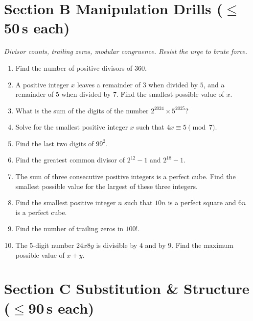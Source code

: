 \documentclass[11pt,a4paper]{article}
\begin{document}
\section*{Section B \quad Manipulation Drills \hfill{\normalfont\small($\leq$50\,s each)}}

\noindent\textit{Divisor counts, trailing zeros, modular congruence. Resist the urge to brute force.}

\begin{enumerate}

\item Find the number of positive divisors of $360$.

\item A positive integer $x$ leaves a remainder of $3$ when divided by $5$, and a remainder of $5$ when divided by $7$. Find the smallest possible value of $x$.

\item What is the sum of the digits of the number $2^{2024} \times 5^{2025}$?

\item Solve for the smallest positive integer $x$ such that $4x \equiv 5 \pmod 7$.

\item Find the last two digits of $99^{2}$.

\item Find the greatest common divisor of $2^{12}-1$ and $2^{18}-1$.

\item The sum of three consecutive positive integers is a perfect cube. Find the smallest possible value for the largest of these three integers.

\item Find the smallest positive integer $n$ such that $10n$ is a perfect square and $6n$ is a perfect cube.

\item Find the number of trailing zeros in $100!$.

\item The 5-digit number $24x8y$ is divisible by $4$ and by $9$. Find the maximum possible value of $x + y$.

\end{enumerate}

\section*{Section C \quad Substitution \& Structure \hfill{\normalfont\small($\leq$90\,s each)}}
\end{document}
